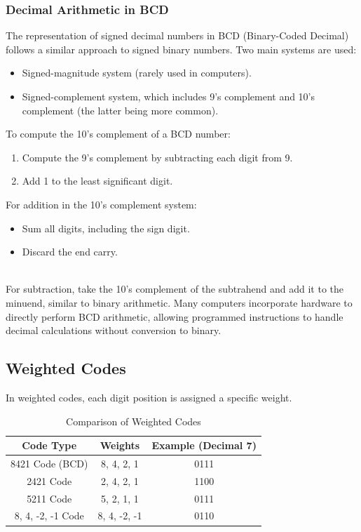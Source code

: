 \documentclass[a4paper,12pt]{article}
\begin{document}
\subsubsection{Decimal Arithmetic in BCD}
The representation of signed decimal numbers in BCD (Binary-Coded Decimal) follows a similar approach to signed binary numbers. Two main systems are used:

\begin{itemize}
    \item Signed-magnitude system (rarely used in computers).
    \item Signed-complement system, which includes 9's complement and 10's complement (the latter being more common).
\end{itemize}

To compute the 10's complement of a BCD number:
\begin{enumerate}
    \item Compute the 9’s complement by subtracting each digit from 9.
    \item Add 1 to the least significant digit.
\end{enumerate}

For addition in the 10's complement system:
\begin{itemize}
    \item Sum all digits, including the sign digit.
    \item Discard the end carry.
\end{itemize}
\\


For subtraction, take the 10’s complement of the subtrahend and add it to the minuend, similar to binary arithmetic. Many computers incorporate hardware to directly perform BCD arithmetic, allowing programmed instructions to handle decimal calculations without conversion to binary.
\subsection{Weighted Codes}
In weighted codes, each digit position is assigned a specific weight.

\begin{table}[h]
    \centering
    \begin{tabular}{|c|c|c|}
        \hline
        \textbf{Code Type} & \textbf{Weights} & \textbf{Example (Decimal 7)} \\
        \hline
        8421 Code (BCD) & 8, 4, 2, 1 & 0111 \\
        2421 Code & 2, 4, 2, 1 & 1100 \\
        5211 Code & 5, 2, 1, 1 & 0111 \\
        8, 4, -2, -1 Code & 8, 4, -2, -1 & 0110 \\
        \hline
    \end{tabular}
    \caption{Comparison of Weighted Codes}
\end{table}
\end{document}

